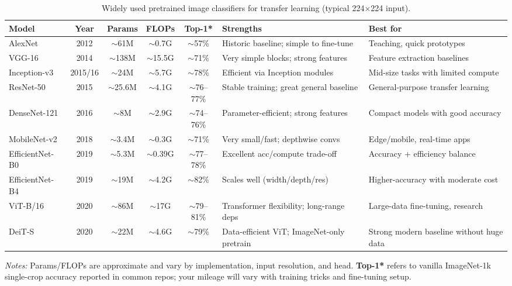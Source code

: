 \documentclass{article}
\begin{document}
\begin{table}[h!]
    \small
    \centering
    \caption{Widely used pretrained image classifiers for transfer learning (typical 224$\times$224 input).}
    \renewcommand{\arraystretch}{1.2}
    \begin{tabularx}{\textwidth}{@{}lccccXX@{}}
    \toprule
    \textbf{Model} & \textbf{Year} & \textbf{Params} & \textbf{FLOPs} & \textbf{Top-1*} & \textbf{Strengths} & \textbf{Best for} \\
    \midrule
    AlexNet & 2012 & $\sim$61M & $\sim$0.7G & $\sim$57\% & Historic baseline; simple to fine-tune & Teaching, quick prototypes \\
    VGG-16 & 2014 & $\sim$138M & $\sim$15.5G & $\sim$71\% & Very simple blocks; strong features & Feature extraction baselines \\
    Inception-v3 & 2015/16 & $\sim$24M & $\sim$5.7G & $\sim$78\% & Efficient via Inception modules & Mid-size tasks with limited compute \\
    ResNet-50 & 2015 & $\sim$25.6M & $\sim$4.1G & $\sim$76--77\% & Stable training; great general baseline & General-purpose transfer learning \\
    DenseNet-121 & 2016 & $\sim$8M & $\sim$2.9G & $\sim$74--76\% & Parameter-efficient; strong features & Compact models with good accuracy \\
    MobileNet-v2 & 2018 & $\sim$3.4M & $\sim$0.3G & $\sim$71\% & Very small/fast; depthwise convs & Edge/mobile, real-time apps \\
    EfficientNet-B0 & 2019 & $\sim$5.3M & $\sim$0.39G & $\sim$77--78\% & Excellent acc/compute trade-off & Accuracy + efficiency balance \\
    EfficientNet-B4 & 2019 & $\sim$19M & $\sim$4.2G & $\sim$82\% & Scales well (width/depth/res) & Higher-accuracy with moderate cost \\
    ViT-B/16 & 2020 & $\sim$86M & $\sim$17G & $\sim$79--81\% & Transformer flexibility; long-range deps & Large-data fine-tuning, research \\
    DeiT-S & 2020 & $\sim$22M & $\sim$4.6G & $\sim$79\% & Data-efficient ViT; ImageNet-only pretrain & Strong modern baseline without huge data \\
    \bottomrule
    \end{tabularx}
    
    \vspace{0.25em}
    \footnotesize \textit{Notes:} Params/FLOPs are approximate and vary by implementation, input resolution, and head. 
    \textbf{Top-1*} refers to vanilla ImageNet-1k single-crop accuracy reported in common repos; your mileage will vary with training tricks and fine-tuning setup.
    \end{table}
\end{document}
